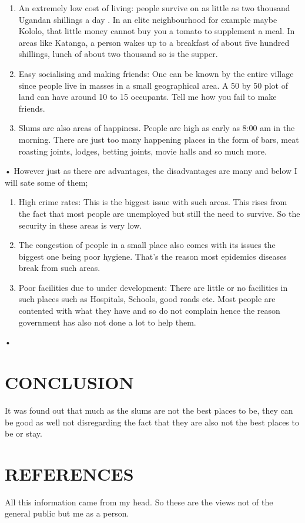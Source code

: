 \documentclass[11pt]{article}
\begin{document}
\begin{enumerate}

\item An extremely low cost of living: people survive on as little as two thousand Ugandan shillings a day
. In an elite neighbourhood for example maybe Kololo, that little money cannot buy you a tomato to supplement a meal. In areas like Katanga,
 a person wakes up to a breakfast of about five hundred shillings, lunch of about two thousand so is the supper.

\item Easy socialising and making friends: One can be known by the entire village since people live in masses in
 a small geographical area. A 50 by 50 plot of land can have around 10 to 15 occupants. Tell me how you fail to make friends.

\item Slums are also areas of happiness. People are high as early as 8:00 am in the morning.
 There are just too many happening places in the form of bars, meat roasting joints, lodges, betting joints, movie halls and so much more. 

\end{enumerate}•
However just as there are advantages, the disadvantages are many and below I will sate some of them;

\begin{enumerate}

\item High crime rates: This is the biggest issue with such areas. This rises from the fact that most people are unemployed
 but still the need to survive. So the security in these areas is very low.

\item The congestion of people in a small place also comes with its issues the biggest one being poor hygiene. That’s the reason most epidemics
 diseases break from such areas.

\item Poor facilities due to under development: There are little or no facilities in such places such as Hospitals, Schools, good roads etc.
 Most people are contented with what they have and so do not complain hence the reason government has also not done a lot to help them.

\end{enumerate}•

\section{CONCLUSION}
It was found out that much as the slums are not the best places to be, they can be good as well not disregarding the
 fact that they are also not the best places to be or stay.

\section{REFERENCES}
All this information came from my head. So these are the views not of the general public but me as a person. 
\end{document}
